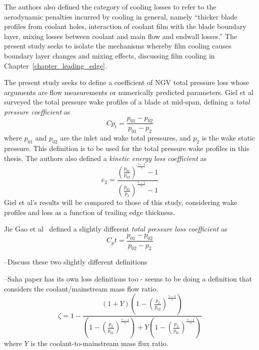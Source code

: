 \documentclass[a4paper, 11pt, twoside]{report}
\begin{document}
The authors also defined the category of cooling losses to refer to the aerodynamic penalties incurred by cooling in general, namely ``thicker blade profiles from coolant holes, interaction of coolant film with the blade boundary layer, mixing losses between coolant and main flow and endwall losses.'' The present study seeks to isolate the mechanisms whereby film cooling causes boundary layer changes and mixing effects, discussing film cooling in Chapter~\ref{chapter_leading_edge}.

The present study seeks to define a coefficient of NGV total pressure loss whose arguments are flow measurements or numerically predicted parameters. Giel et al surveyed the total pressure wake profiles of a blade at mid-span, defining a \textit{total pressure coefficient} as
\begin{equation}
Cp_t = \frac{
p_{01} - p_{02}
}{
p_{01} - p_2
}
\end{equation}
where $p_{01}$ and $p_{02}$ are the inlet and wake total pressures, and $p_2$ is the wake static pressure. This definition is to be used for the total pressure wake profiles in this thesis. The authors also defined a \textit{kinetic energy loss coefficient} as
\begin{equation}
e_2 = \frac{ 
\left( \frac{p_{01}}{p_{02}} \right)^\frac{\gamma-1}{ \gamma } - 1 
}{
\left( \frac{p_{01}}{p_{2}} \right)^\frac{\gamma-1}{ \gamma } - 1 
}
\end{equation}
Giel et al's results will be compared to those of this study, considering wake profiles and loss as a function of trailing edge thickness.

Jie Gao et al~\cite{gao_te} defined a slightly different \textit{total pressure loss coefficient} as
\begin{equation}
C_pt = \frac{
p_{01} - p_{02}
}{
p_{02} - p_2
}
\end{equation}

--Discuss these two slightly different definitions


 
--Saha paper has its own loss definitions too - seems to be doing a definition that considers the coolant/mainstream mass flow ratio.
\begin{equation}
\zeta = 
1 -
\frac{ 
	\left( 1 + Y \right) 
	\left(
		1 -
		\left(
			\frac{p_2}{p_{02}}
		\right)
		^\frac{\gamma-1}{\gamma}
	\right)
}{
	\left(
		1 -
		\left(
			\frac{p_2}{p_{01}}
		\right)
		^\frac{\gamma-1}{\gamma}
	\right)
	+Y
	\left(
		1 -
		\left(
			\frac{p_2}{p_{0c}}
		\right)
		^\frac{\gamma-1}{\gamma}
	\right)
}
\end{equation}
where $Y$ is the coolant-to-mainstream mass flux ratio.
\end{document}
